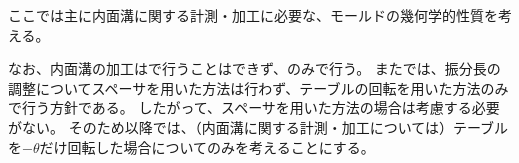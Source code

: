 ここでは主に内面溝に関する計測・加工に必要な、モールドの幾何学的性質を考える。

なお、内面溝の加工は\MMname で行うことはできず、\DMname のみで行う。
また\DMname では、振分長の調整についてスペーサを用いた方法は行わず、テーブルの回転を用いた方法のみで行う方針である。
したがって、スペーサを用いた方法の場合は考慮する必要がない。
そのため以降では、（内面溝に関する計測・加工については）テーブルを$-\theta$だけ回転した場合についてのみを考えることにする。




